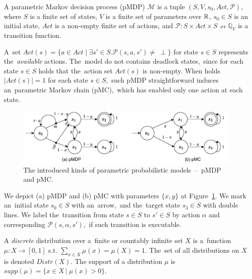 \begin{definition}[pMDP]
A parametric Markov decision process (pMDP) $\mathcal{M}$ is a tuple $(S, V, s_0, Act, \mathcal{P})$, where $S$ is a finite set of states, $V$ is a finite set of parameters over $\mathbb{R}$, $s_0 \in S$ is an initial state, $Act$ is a non-empty finite set of actions, and $\mathcal{P}: S \times Act  \times S \nrightarrow \mathbb{Q}_V$ is a transition function.
\end{definition}
\noindent
A~set $\mathit{Act(s) = \{ a \in Act \; \lvert \; \exists s' \in S. \mathcal{P}(s, a, s') \neq \; \perp \}}$ for state $s \in S$ represents the~\textit{available} actions.
The~model do not contains deadlock states,~since for each state $s \in S$ holds that the~action set $Act(s)$ is non-empty.
When holds $\lvert \mathit{Act(s)} \rvert = 1$ for each state $s \in S$,~such pMDP straightforward induces an~parametric Markov chain (pMC),~which has enabled only one action at each state.

\begin{figure}[h!]
\centering
\includegraphics[width=1.0\textwidth]{figures/param_models.pdf}
\caption{The introduced kinds of parametric probabilistic models \,--\, pMDP and pMC.}%
\label{fig:param_models}%
\end{figure}

\begin{example}
We depict (a) pMDP and (b) pMC with parameters $\{x, y\}$ at Figure~\ref{fig:param_models}.
We mark an~initial state $s_0 \in S$  with an~arrow,~and the~target state $s_3 \in S$ with double lines.
We label the~transition from state $s \in S$ to $s' \in S$ by action $\alpha$ and corresponding $\mathcal{P}(s, \alpha, s')$,~if such transition is executable.
\end{example}

\begin{definition}[Distribution]
\cite{tacas21} 
    A \textit{discrete} distribution over a~finite or countably infinite set $X$ is a~function $\mu: X \rightarrow [0,1]$ s.t. $\sum_{x \in X} \mu(x) = \mu(X) = 1$.
    The~set of all distributions on $X$ is denoted $Distr(X)$.
    The support of a distribution $\mu$ is $supp(\mu) = \{ x \in X \, \lvert \; \mu(x) > 0 \}$.
\end{definition}

